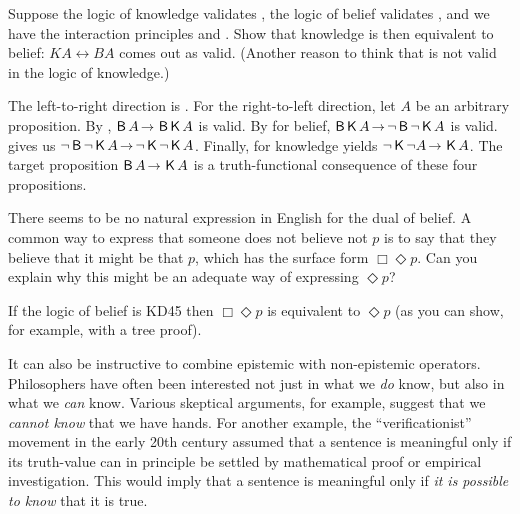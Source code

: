 \begin{exercise}
  Suppose the logic of knowledge validates , the logic of belief validates
  , and we have the interaction principles  and . Show that
  knowledge is then equivalent to belief: $KA \leftrightarrow BA$ comes out as
  valid. (Another reason to think that  is not valid in the logic of
  knowledge.)
\end{exercise}
\begin{solution}
  The left-to-right direction is . For the right-to-left direction, let
  $A$ be an arbitrary proposition. By , $\Bel A \to \Bel\Kn A$ is valid.
  By  for belief, $\Bel \Kn A \to \neg\Bel \neg \Kn A$ is valid. 
  gives us $\neg \Bel \neg \Kn A \to \neg\Kn\neg\Kn A$. Finally,  for
  knowledge yields $\neg \Kn\neg A \to \Kn A$. The target proposition
  $\Bel A \to \Kn A$ is a truth-functional consequence of these four
  propositions.
\end{solution}


\begin{exercise}
  There seems to be no natural expression in English for the dual of belief. A
  common way to express that someone does not believe not $p$ is to say that
  they believe that it might be that $p$, which has the surface form
  $\Box\Diamond p$. Can you explain why this might be an adequate way of expressing $\Diamond p$?
\end{exercise}
\begin{solution}
  If the logic of belief is KD45 then $\Box\Diamond p$ is equivalent to
  $\Diamond p$ (as you can show, for example, with a tree proof).
\end{solution}

It can also be instructive to combine epistemic with non-epistemic operators.
Philosophers have often been interested not just in what we \emph{do} know, but
also in what we \emph{can} know. Various skeptical arguments, for example,
suggest that we \emph{cannot know} that we have hands. For another example, the
``verificationist'' movement in the early 20th century assumed that a sentence
is meaningful only if its truth-value can in principle be settled by
mathematical proof or empirical investigation. This would imply that a sentence
is meaningful only if \emph{it is possible to know} that it is true.


